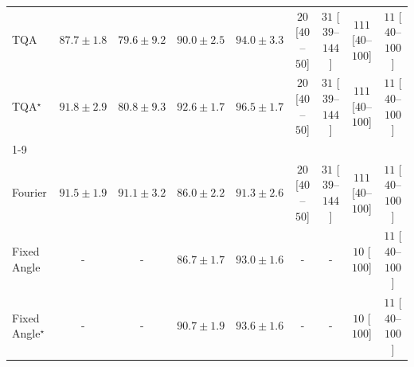 \begin{tabular}{l|cccc|cccc|}
TQA & {\cellcolor[HTML]{FEA030}} \color[HTML]{000000} $87.7\pm 1.8$ & {\cellcolor[HTML]{FFF8C4}} \color[HTML]{000000} $79.6\pm 9.2$ & {\cellcolor[HTML]{F27D1B}} \color[HTML]{F1F1F1} $90.0\pm 2.5$ & {\cellcolor[HTML]{C44802}} \color[HTML]{F1F1F1} $94.0\pm 3.3$ & {\cellcolor[HTML]{FFF4F0}} \color[HTML]{000000} $20$ [$40$--$50$] & {\cellcolor[HTML]{FEF1ED}} \color[HTML]{000000} $31$ [$39$--$144$] & {\cellcolor[HTML]{FDDAD7}} \color[HTML]{000000} $111$ [$40$--$100$] & {\cellcolor[HTML]{FFF7F3}} \color[HTML]{000000} $11$ [$40$--$100$] \\
TQA$^\star$ & {\cellcolor[HTML]{E1640E}} \color[HTML]{F1F1F1} $91.8\pm 2.9$ & {\cellcolor[HTML]{FFF2B1}} \color[HTML]{000000} $80.8\pm 9.3$ & {\cellcolor[HTML]{D75908}} \color[HTML]{F1F1F1} $92.6\pm 1.7$ & {\cellcolor[HTML]{943304}} \color[HTML]{F1F1F1} $96.5\pm 1.7$ & {\cellcolor[HTML]{FFF4F0}} \color[HTML]{000000} $20$ [$40$--$50$] & {\cellcolor[HTML]{FEF1ED}} \color[HTML]{000000} $31$ [$39$--$144$] & {\cellcolor[HTML]{FDDAD7}} \color[HTML]{000000} $111$ [$40$--$100$] & {\cellcolor[HTML]{FFF7F3}} \color[HTML]{000000} $11$ [$40$--$100$] \\
\cline{1-9}
\multicolumn{9}{c}{\rule{0pt}{8pt}PP} \\
\midrule
Fourier & {\cellcolor[HTML]{3AA257}} \color[HTML]{F1F1F1} $91.5\pm 1.9$ & {\cellcolor[HTML]{3FA85B}} \color[HTML]{F1F1F1} $91.1\pm 3.2$ & {\cellcolor[HTML]{A4D98A}} \color[HTML]{000000} $86.0\pm 2.2$ & {\cellcolor[HTML]{3DA559}} \color[HTML]{F1F1F1} $91.3\pm 2.6$ & {\cellcolor[HTML]{FFF4F0}} \color[HTML]{000000} $20$ [$40$--$50$] & {\cellcolor[HTML]{FEF1ED}} \color[HTML]{000000} $31$ [$39$--$144$] & {\cellcolor[HTML]{FDDAD7}} \color[HTML]{000000} $111$ [$40$--$100$] & {\cellcolor[HTML]{FFF7F3}} \color[HTML]{000000} $11$ [$40$--$100$] \\
Fixed Angle & {\cellcolor[HTML]{000000}} \color[HTML]{F1F1F1} {\cellcolor{white}} \color{black} - & {\cellcolor[HTML]{000000}} \color[HTML]{F1F1F1} {\cellcolor{white}} \color{black} - & {\cellcolor[HTML]{95D385}} \color[HTML]{000000} $86.7\pm 1.7$ & {\cellcolor[HTML]{2A8D49}} \color[HTML]{F1F1F1} $93.0\pm 1.6$ & {\cellcolor[HTML]{000000}} \color[HTML]{F1F1F1} {\cellcolor{white}} \color{black} - & {\cellcolor[HTML]{000000}} \color[HTML]{F1F1F1} {\cellcolor{white}} \color{black} - & {\cellcolor[HTML]{FFF7F3}} \color[HTML]{000000} $10$ [$100$] & {\cellcolor[HTML]{FFF7F3}} \color[HTML]{000000} $11$ [$40$--$100$] \\
Fixed Angle$^\star$ & {\cellcolor[HTML]{000000}} \color[HTML]{F1F1F1} {\cellcolor{white}} \color{black} - & {\cellcolor[HTML]{000000}} \color[HTML]{F1F1F1} {\cellcolor{white}} \color{black} - & {\cellcolor[HTML]{45AD5F}} \color[HTML]{F1F1F1} $90.7\pm 1.9$ & {\cellcolor[HTML]{238443}} \color[HTML]{F1F1F1} $93.6\pm 1.6$ & {\cellcolor[HTML]{000000}} \color[HTML]{F1F1F1} {\cellcolor{white}} \color{black} - & {\cellcolor[HTML]{000000}} \color[HTML]{F1F1F1} {\cellcolor{white}} \color{black} - & {\cellcolor[HTML]{FFF7F3}} \color[HTML]{000000} $10$ [$100$] & {\cellcolor[HTML]{FFF7F3}} \color[HTML]{000000} $11$ [$40$--$100$] \\

\end{tabular}
